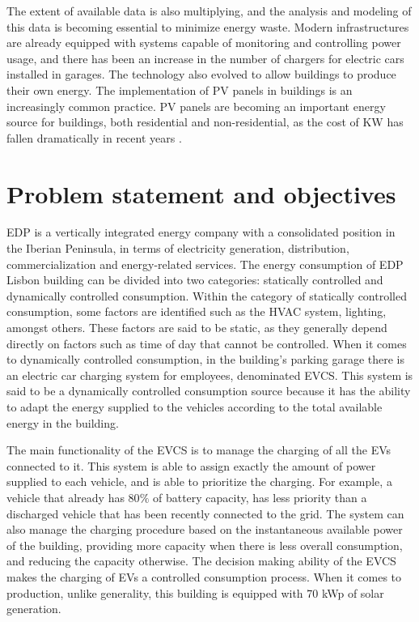 The extent of available data is also multiplying, and the analysis and modeling of this data is becoming essential to minimize energy waste. Modern infrastructures are already equipped with systems capable of monitoring and controlling power usage, and there has been an increase in the number of chargers for electric cars installed in garages. The technology also evolved to allow buildings to produce their own energy. The implementation of \ac{PV} panels in buildings is an increasingly common practice. \ac{PV} panels are becoming an important energy source for buildings, both  residential and non-residential, as the cost of KW has fallen dramatically in recent years \cite{pvedp}. 









\section{Problem statement and objectives}


\ac{EDP} is a vertically integrated energy company with a consolidated position in the Iberian Peninsula, in terms of electricity generation, distribution, commercialization and energy-related services. The energy consumption of \ac{EDP} Lisbon building can be divided into two categories: statically controlled and dynamically controlled consumption. Within the category of statically controlled consumption, some factors are identified such as the \ac{HVAC} system, lighting, amongst others. These factors are said to be static, as they generally depend directly on factors such as time of day that cannot be controlled. When it comes to dynamically controlled consumption, in the building's parking garage there is an electric car charging system for employees, denominated \ac{EVCS}. This system is said to be a dynamically controlled consumption source because it has the ability to adapt the energy supplied to the vehicles according to the total available energy in the building. 

The main functionality of the \ac{EVCS} is to manage the charging of all the \ac{EV}s connected to it. This system is able to assign exactly the amount of power supplied to each vehicle, and is able to prioritize the charging. For example, a vehicle that already has 80$\%$ of battery capacity, has less priority than a discharged vehicle that has been recently connected to the grid. The system can also manage the charging procedure based on the instantaneous available power of the building, providing more capacity when there is less overall consumption, and reducing the capacity otherwise. The decision making ability of the \ac{EVCS} makes the charging of \ac{EV}s a controlled consumption process. When it comes to production, unlike generality, this building is equipped with 70 kWp of solar generation. 



